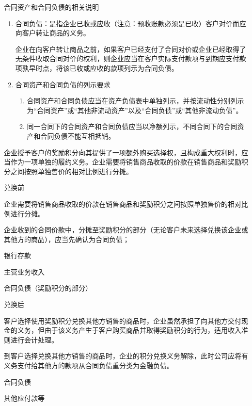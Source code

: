 \documentclass[UTF8,12pt]{ctexart}
\newenvironment{Dr}{%
	\begin{list}{}%
		{
			\setlength{\leftmargin}{2em}
			\setlength{\labelwidth}{2em}
			\setlength{\labelsep}{0pt}
			\setlength{\itemindent}{0pt}
			\setlength{\listparindent}{0pt}
			\setlength{\parsep}{0pt}
			\setlength{\topsep}{0pt}
		}
		\item[\textbf{借：}]
	}{%
	\end{list}
}
\newenvironment{Cr}{%
	\begin{list}{}%
		{
			\setlength{\leftmargin}{3em}
			\setlength{\labelwidth}{2em}
			\setlength{\labelsep}{0pt}
			\setlength{\itemindent}{0pt}
			\setlength{\listparindent}{0pt}
			\setlength{\parsep}{0pt}
			\setlength{\topsep}{0pt}
		}
		\item[\textbf{贷：}]
	}{%
	\end{list}
}
\numberwithin{equation}{section} %
\numberwithin{figure}{section}
\numberwithin{table}{section}
\begin{document}
	合同资产和合同负债的相关说明
	\begin{enumerate}
		\item 合同负债：是指企业已收或应收（注意：预收账款必须是已收）客户对价而应向客户转让商品的义务。
		
		企业在向客户转让商品之前，如果客户已经支付了合同对价或企业已经取得了无条件收取合同对价的权利，则企业应当在客户实际支付款项与到期应支付款项孰早时点，将该已收或应收的款项列示为合同负债。
		
		\item 合同资产和合同负债的列示要求
		\begin{enumerate}
			\item 合同资产和合同负债应当在资产负债表中单独列示，并按流动性分别列示为“合同资产”或“其他非流动资产”以及“合同负债”或“其他非流动负债”。
			
			\item 同一合同下的合同资产和合同负债应当以净额列示，不同合同下的合同资产和合同负债不能互相抵销。
		\end{enumerate}
	\end{enumerate}
	
	企业授予客户的奖励积分向其提供了一项额外购买选择权，且构成重大权利时，应当作为一项单独的履约义务。企业需要将销售商品收取的价款在销售商品和奖励积分之间按照单独售价的相对比例进行分摊。
	
	兑换前
	\begin{enumerate}
		\item 企业需要将销售商品收取的价款在销售商品和奖励积分之间按照单独售价的相对比例进行分摊。
		
		\item 企业收到的合同价款中，分摊至奖励积分的部分（无论客户未来选择兑换该企业或其他方的商品），应当先确认为合同负债；
		
		\begin{Dr}
			银行存款
		\end{Dr}
		\begin{Cr}
			主营业务收入
			
			合同负债（奖励积分的部分）
		\end{Cr}
	\end{enumerate}	

	兑换后	
	\begin{enumerate}
		\item 客户选择使用奖励积分兑换其他方销售的商品时，企业虽然承担了向其他方交付现金的义务，但由于该义务产生于客户购买商品并取得奖励积分的行为，适用收入准则进行会计处理。
		
		\item 到客户选择兑换其他方销售的商品时，企业的积分兑换义务解除，此时公司应将有义务支付给其他方的款项从合同负债重分类为金融负债。
		
		\begin{Dr}
			合同负债
		\end{Dr}
		\begin{Cr}
			其他应付款等
		\end{Cr}
	\end{enumerate}
\end{document}
